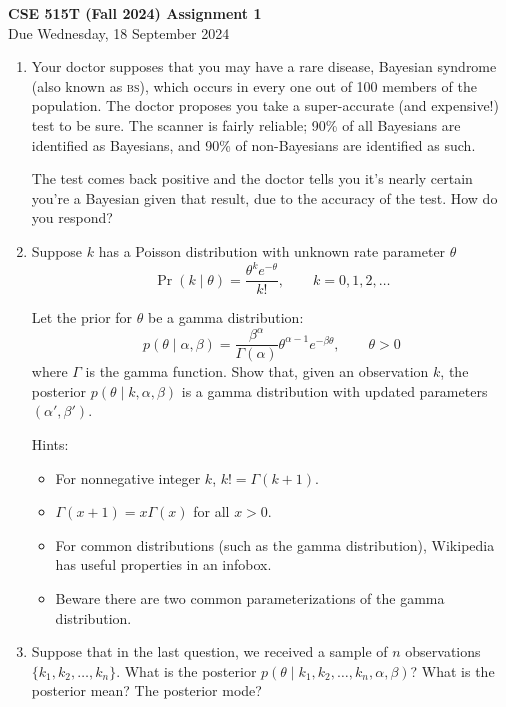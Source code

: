 \documentclass{article}
\newcommand{\acro}[1]{\textsc{\MakeLowercase{#1}}}
\newcommand{\given}{\mid}
\begin{document}
{\large \textbf{CSE 515T (Fall 2024) Assignment 1}} \\
Due Wednesday, 18 September 2024 \\

\begin{enumerate}

\item
  Your doctor supposes that you may have a rare disease, Bayesian
  syndrome (also known as \acro{BS}), which occurs in every one out of
  100 members of the population. The doctor proposes you take a
  super-accurate (and expensive!) test to be sure.  The scanner is
  fairly reliable; 90\% of all Bayesians are identified as Bayesians,
  and 90\% of non-Bayesians are identified as such.

  The test comes back positive and the doctor tells you it's nearly
  certain you're a Bayesian given that result, due to the accuracy of
  the test. How do you respond?

\item
  Suppose $k$ has a Poisson distribution with unknown rate parameter
  $\theta$
  \[
    \Pr(k \given \theta) = \frac{\theta^k e^{-\theta}}{k!},
    \qquad
    k = 0, 1, 2, \dotsc
  \]

  Let the prior for $\theta$ be a gamma distribution:
  \[
    p(\theta \given \alpha, \beta)
    =
    \frac{\beta^\alpha}
         {\Gamma(\alpha)}
    \theta^{\alpha - 1}e^{-\beta\theta},
    \qquad \theta > 0
  \]
  where $\Gamma$ is the gamma function.  Show that, given an
  observation $k$, the posterior $p(\theta \given k, \alpha, \beta)$
  is a gamma distribution with updated parameters $(\alpha', \beta')$.

  Hints:
  \begin{itemize}
  \item For nonnegative integer $k$, $k! = \Gamma(k + 1)$.
  \item $\Gamma(x + 1) = x\Gamma(x)$ for all $x > 0$.
  \item For common distributions (such as the gamma distribution),
    Wikipedia has useful properties in an infobox.
  \item Beware there are two common parameterizations of the gamma distribution.
  \end{itemize}

\item
  Suppose that in the last question, we received a sample of $n$
  observations $\{k_1, k_2, \dotsc, k_n\}$. What is the posterior
  $p(\theta \given k_1, k_2, \dotsc, k_n, \alpha, \beta)$? What is the
  posterior mean? The posterior mode?


\end{enumerate}
\end{document}
